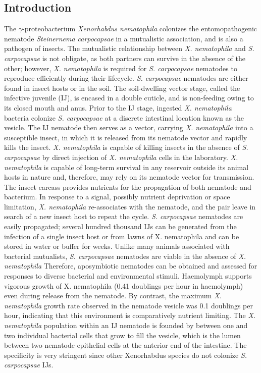 \documentclass[10pt]{article}
\newcommand{\Xnema}{\textit{X. nematophila} }
\newcommand{\Scarpo}{\textit{S. carpocapsae} }
\newcommand{\XNema}{\textit{Xenorhabdus nematophila} }
\newcommand{\SCarpo}{\textit{Steinernema carpocapsae} }
\begin{document}
\begin{multicols}{2}
\section*{Introduction}
The $\gamma$-proteobacterium \XNema colonizes the entomopathogenic nematode \SCarpo in a mutualistic association, and is also a pathogen of insects. 
The mutualistic relationship between \Xnema and \Scarpo is not obligate, as both partners can survive in the absence of the other; however, \Xnema is required for \Scarpo nematodes to reproduce efficiently during their lifecycle. 
\Scarpo nematodes are either found in insect hosts or in the soil. The soil-dwelling vector stage, called the infective juvenile (IJ), is encased in a double cuticle, and is non-feeding owing to its closed mouth and anus.
Prior to the IJ stage, ingested \Xnema bacteria colonize \Scarpo at a discrete intestinal location known as the vesicle. 
The IJ nematode then serves as a vector, carrying \Xnema into a susceptible insect, in which it is released from its nematode vector and rapidly kills the insect. 
\Xnema is capable of killing insects in the absence of \Scarpo by direct injection of \Xnema cells in the laboratory. 
\Xnema is capable of long-term survival in any reservoir outside its animal hosts in nature and, therefore, may rely on its nematode vector for transmission. 
The insect carcass provides nutrients for the propagation of both nematode and bacterium. 
In response to a signal, possibly nutrient deprivation or space limitation, \Xnema re-associates with the nematode, and the pair leave in search of a new insect host to repeat the cycle.
\Scarpo nematodes are easily propagated; several hundred thousand IJs can be generated from the infection of a single insect host or from lawns of X. nematophila and can be stored in water or buffer for weeks. 
Unlike many animals associated with bacterial mutualists, \Scarpo nematodes are viable in the absence of \Xnema Therefore, aposymbiotic nematodes can be obtained and assessed for responses to diverse bacterial and environmental stimuli. 
Haemolymph supports vigorous growth of X. nematophila (0.41 doublings per hour in haemolymph) even during release from the nematode. By contrast, the maximum \Xnema growth rate observed in the nematode vesicle was 0.1 doublings per hour, indicating that this environment is comparatively nutrient limiting.
The \Xnema population within an IJ nematode is founded by between one and two individual bacterial cells that grow to fill the vesicle, which is the lumen between two nematode epithelial cells at the anterior end of the intestine\cite{Martens}. The specificity is very stringent since other Xenorhabdus species do not colonize \Scarpo IJs.


\end{multicols}
\end{document}
